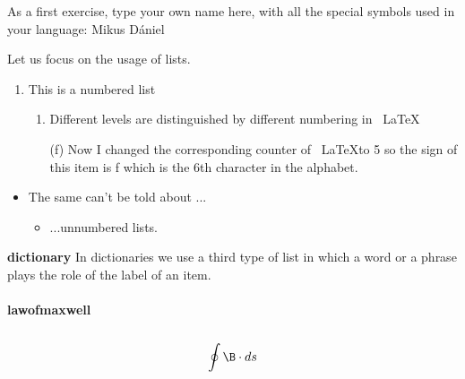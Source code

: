 \documentclass[12pt]{article}
\begin{document}
As a first exercise, type your own name here, with all the special symbols used in your language: Mikus Dániel \par
Let us focus on the usage of lists.
\begin{enumerate}
    \item This is a numbered list
    \begin{enumerate}
        \item Different levels are distinguished by different numbering in ~\LaTeX
        \item[(f)] Now I changed the corresponding counter of ~\LaTeX to 5 so the sign of this item is f which is the 6th character in the alphabet.
    \end{enumerate}
\end{enumerate}
\begin{itemize}
    \item The same can't be told about ...
    \begin{itemize}
        \item ...unnumbered lists.
    \end{itemize}
\end{itemize} \par
\textbf{\gls{dictionary}} In dictionaries we use a third type of list in which a word or a phrase plays the role of the label of an item. \\ \\
\textbf{\gls{lawofmaxwell}} \\ \\
\centering
\begin{equation}
    \oint \B \cdot ds 
\end{equation}
\end{document}

